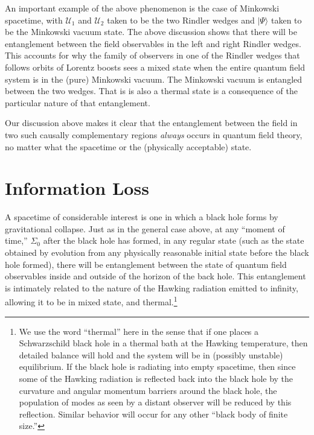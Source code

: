 \documentclass[12pt,nofootinbib,amsmath,amssymb,amsfonts,aps,prd,groupedaddress]{revtex4-1}
\begin{document}
An important example of the above phenomenon is the case of Minkowski spacetime,
with ${\mathcal U}_1$ and ${\mathcal U}_2$ taken to be the two Rindler wedges
and $| \Psi \rangle$ taken to be the Minkowski vacuum state.  The above
discussion shows that there will be entanglement between the field observables
in the left and right Rindler wedges. This accounts for why the family of
observers in one of the Rindler wedges that follows orbits of Lorentz boosts
sees a mixed state when the entire quantum field system is in the
(pure) Minkowski vacuum. The Minkowski vacuum is entangled between the two wedges. That is is also
a thermal state is a consequence of the particular nature of that entanglement.

 Our discussion above makes it clear that the
entanglement between the field in two such causally complementary regions {\it
always} occurs in quantum field theory, no matter what the spacetime or the
(physically acceptable) state.

\section{Information Loss} \label{infoloss}

A spacetime of considerable interest is one in which a black hole forms by
gravitational collapse. Just as in the general case above, at any ``moment of
time,'' $\Sigma_0$ after the black hole has formed, in any regular state (such as the state 
obtained by evolution from any physically 
reasonable initial state before the black hole formed), there
will be entanglement between the state of quantum field observables inside and
outside of the horizon of the back hole. This entanglement is intimately related to the nature
of the Hawking radiation emitted to infinity, allowing it to be in mixed state, and thermal.\footnote{We use the word ``thermal'' here in the sense that if one places a Schwarzschild black hole in a thermal bath at the Hawking temperature, then detailed balance will hold and the system will be in (possibly unstable) equilibrium. If the black hole is radiating into empty spacetime, then since some of the Hawking radiation is reflected back into the black hole by the curvature and angular momentum barriers around 
the black hole, the population of modes as seen by a distant observer will be reduced by this reflection. Similar behavior will occur for any other ``black body of finite size.''} 
\end{document}
